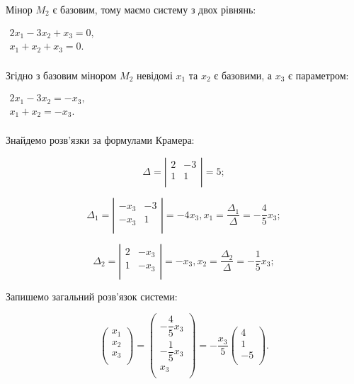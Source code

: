 Мінор $M_2$ є базовим, тому маємо систему з двох рівнянь:

$\begin{matrix}
	2x_1 - 3x_2 + x_3 = 0, \\
	x_1 + x_2 + x_3 = 0. \\
\end{matrix}$

Згідно з базовим мінором $M_2$ невідомі $x_1$ та $x_2$ є базовими, а $x_3$ є параметром:

$\begin{matrix}
	2x_1 - 3x_2 = -x_3, \\
	x_1 + x_2 = -x_3. \\
\end{matrix}$

Знайдемо розв’язки за формулами Крамера:

$$\Delta = \left|\begin{matrix}
	2 & -3 \\
	1 &  1 \\
\end{matrix}\right| = 5;$$

$$\Delta_1 = \left|\begin{matrix}
	-x_3 & -3 \\
	-x_3 &  1 \\
\end{matrix}\right| = -4x_3, x_1 = \dfrac{\Delta_1}{\Delta} = -\dfrac{4}{5} x_3 ;$$

$$\Delta_2 = \left|\begin{matrix}
	2 & -x_3 \\
	1 & -x_3 \\
\end{matrix}\right| = -x_3, x_2 = \dfrac{\Delta_2}{\Delta} = -\dfrac{1}{5} x_3 ;$$

Запишемо загальний розв’язок системи:

$$\begin{pmatrix}
	x_1 \\
	x_2 \\
	x_3 \\
\end{pmatrix} = \begin{pmatrix}
	- \dfrac{4}{5} x_3 \\
	- \dfrac{1}{5} x_3 \\
	x_3 \\
\end{pmatrix}  = - \dfrac{x_3}{5} \begin{pmatrix}
	4 \\
	1 \\
	-5 \\
\end{pmatrix}.$$

